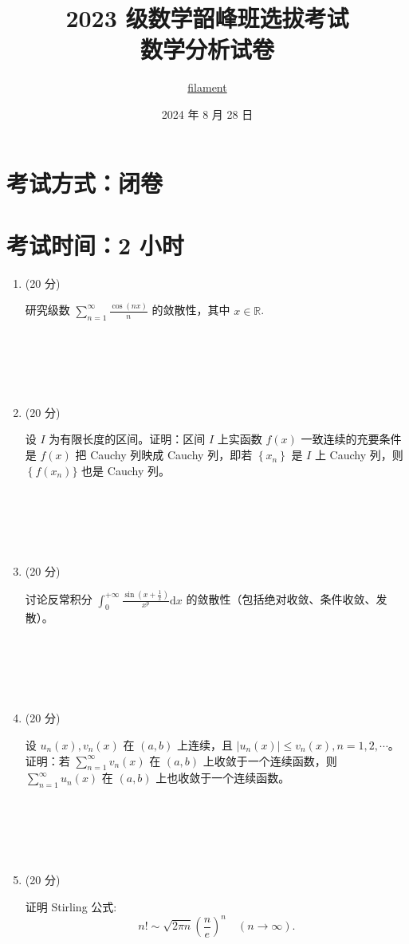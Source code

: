 \documentclass{article}
\title{2023 级数学韶峰班选拔考试 \\ 数学分析试卷}
\author{\href{https://github.com/Unconnectable}{filament}} %
\date{2024 年 8 月 28 日}
\begin{document}
\maketitle

\section*{考试方式：闭卷}
\section*{考试时间：2 小时}

\begin{enumerate}
    \item (20 分) 
    \begin{tcolorbox}[colframe=blue!50!black, colback=blue!5!white]
    研究级数 $\sum_{n=1}^{\infty} \frac{\cos(n x)}{n}$ 的敛散性，其中 $x \in \mathbb{R}$.
    \end{tcolorbox} \\\\\\\\
    
    \item (20 分) 
    \begin{tcolorbox}[colframe=green!50!black, colback=green!5!white]
    设 $I$ 为有限长度的区间。证明：区间 $I$ 上实函数 $f(x)$ 一致连续的充要条件是 $f(x)$ 把 Cauchy 列映成 Cauchy 列，即若 $\left\{x_{n}\right\}$ 是 $I$ 上 Cauchy 列，则 $\left\{f\left(x_{n}\right)\}$ 也是 Cauchy 列。
    \end{tcolorbox} \\\\\\\\
    
    \item (20 分) 
    \begin{tcolorbox}[colframe=red!50!black, colback=red!5!white]
    讨论反常积分 $\int_{0}^{+\infty} \frac{\sin \left(x+\frac{1}{x}\right)}{x^{p}} \mathrm{d}x$ 的敛散性（包括绝对收敛、条件收敛、发散）。
    \end{tcolorbox} \\\\\\\\
    
    \item (20 分) 
    \begin{tcolorbox}[colframe=purple!50!black, colback=purple!5!white]
    设 $u_{n}(x), v_{n}(x)$ 在 $(a, b)$ 上连续，且 $\left|u_{n}(x)\right| \leq v_{n}(x), n=1,2, \cdots$。证明：若 $\sum_{n=1}^{\infty} v_{n}(x)$ 在 $(a, b)$ 上收敛于一个连续函数，则 $\sum_{n=1}^{\infty} u_{n}(x)$ 在 $(a, b)$ 上也收敛于一个连续函数。
    \end{tcolorbox} \\\\\\\\
    
    \item (20 分) 
    \begin{tcolorbox}[colframe=orange!50!black, colback=orange!5!white]
    证明 Stirling 公式: 
    \[
    n! \sim \sqrt{2 \pi n}\left(\frac{n}{e}\right)^{n} \quad (n \to \infty).
    \]
    \end{tcolorbox}
\end{enumerate}
\end{document}
